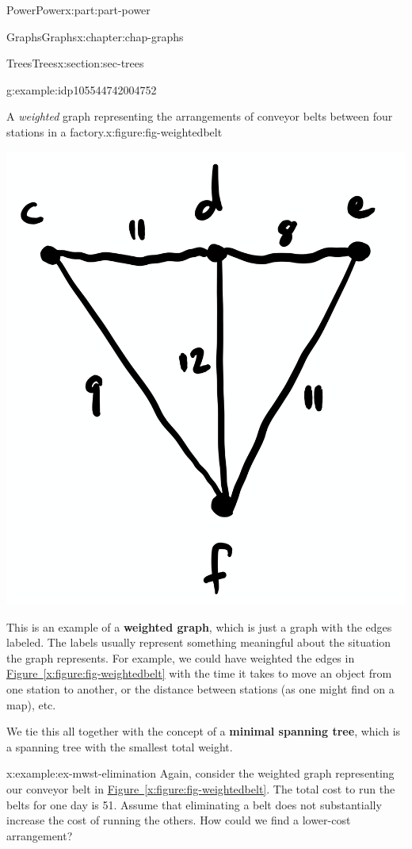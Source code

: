 \documentclass[oneside,10pt,]{book}
\newcommand{\xreffont}{\relax}
\newcommand{\terminology}[1]{\textbf{#1}}
\numberwithin{equation}{section}
\begin{document}
\begin{partptx}{Power}{}{Power}{}{}{x:part:part-power}
\begin{chapterptx}{Graphs}{}{Graphs}{}{}{x:chapter:chap-graphs}
\begin{sectionptx}{Trees}{}{Trees}{}{}{x:section:sec-trees}
\begin{example}{}{g:example:idp105544742004752}
\begin{figureptx}{A \emph{weighted} graph representing the arrangements of conveyor belts between four stations in a factory.}{x:figure:fig-weightedbelt}{}
\begin{image}{0.25}{0.5}{0.25}
\includegraphics[width=\linewidth]{images/graph05.png}
\end{image}%
\tcblower
\end{figureptx}%
This is an example of a \terminology{weighted graph}, which is just a graph with the edges labeled. The labels usually represent something meaningful about the situation the graph represents. For example, we could have weighted the edges in \hyperref[x:figure:fig-weightedbelt]{Figure~{\xreffont\ref{x:figure:fig-weightedbelt}}} with the time it takes to move an object from one station to another, or the distance between stations (as one might find on a map), etc.%
\end{example}
We tie this all together with the concept of a \terminology{minimal spanning tree}, which is a spanning tree with the smallest total weight.%
\begin{example}{}{x:example:ex-mwst-elimination}%
Again, consider the weighted graph representing our conveyor belt in \hyperref[x:figure:fig-weightedbelt]{Figure~{\xreffont\ref{x:figure:fig-weightedbelt}}}. The total cost to run the belts for one day is \textdollar{}51. Assume that eliminating a belt does not substantially increase the cost of running the others. How could we find a lower-cost arrangement?%

\end{example}
\end{sectionptx}
\end{chapterptx}
\end{partptx}
\end{document}
